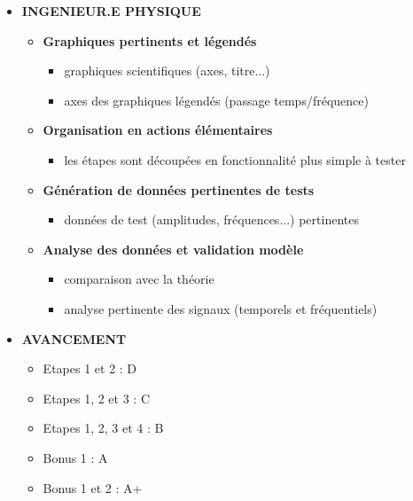 \documentclass[10pt]{article} %
\begin{document}
\begin{itemize}
	\item \textbf{INGENIEUR.E PHYSIQUE}
	\begin{itemize}
		\item \textbf{Graphiques pertinents et légendés}
		\begin{itemize}
			\item graphiques scientifiques (axes, titre...)
			\item axes des graphiques légendés (passage temps/fréquence)
		\end{itemize}		 
		\item \textbf{Organisation en actions élémentaires}
		\begin{itemize}
			\item les étapes sont découpées en fonctionnalité plus simple à tester
		\end{itemize}
		\item \textbf{Génération de données pertinentes de tests}
		\begin{itemize}
			\item données de test (amplitudes, fréquences...) pertinentes
		\end{itemize}
		\item \textbf{Analyse des données et validation modèle}
		\begin{itemize}
			\item comparaison avec la théorie
			\item analyse pertinente des signaux (temporels et fréquentiels)
		\end{itemize}
	\end{itemize}
	
	\item \textbf{AVANCEMENT}
	\begin{itemize}
		\item Etapes 1 et 2 : D
		\item Etapes 1, 2 et 3 : C
		\item Etapes 1, 2, 3 et 4 : B
		\item Bonus 1 : A
		\item Bonus 1 et 2 : A+
	\end{itemize}
\end{itemize}

	

\end{document}
